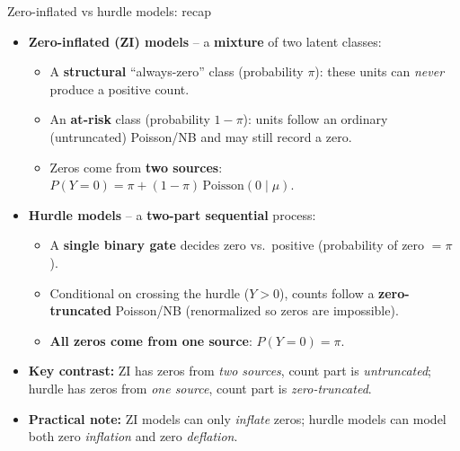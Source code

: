 \documentclass[10pt,ignorenonframetext,aspectratio=169]{beamer}
\begin{document}
\begin{frame}{Zero-inflated vs hurdle models: recap}
\begin{itemize}
    \item \textbf{Zero-inflated (ZI) models} -- a \textbf{mixture} of two latent classes:
    \begin{itemize}
        \item A \textbf{structural} ``always-zero'' class (probability $\pi$): these units can \emph{never} produce a positive count.
        \item An \textbf{at-risk} class (probability $1-\pi$): units follow an ordinary (untruncated) Poisson/NB and may still record a zero.
        \item Zeros come from \textbf{two sources}: $P(Y=0) = \pi + (1-\pi)\,\mathrm{Poisson}(0\mid\mu)$.
    \end{itemize}
    \item \textbf{Hurdle models} -- a \textbf{two-part sequential} process:
    \begin{itemize}
        \item A \textbf{single binary gate} decides zero vs.\ positive (probability of zero $= \pi$).
        \item Conditional on crossing the hurdle ($Y>0$), counts follow a \textbf{zero-truncated} Poisson/NB (renormalized so zeros are impossible).
        \item \textbf{All zeros come from one source}: $P(Y=0) = \pi$.
    \end{itemize}
    \item \textbf{Key contrast:} ZI has zeros from \emph{two sources}, count part is \emph{untruncated}; hurdle has zeros from \emph{one source}, count part is \emph{zero-truncated}.
    \item \textbf{Practical note:} ZI models can only \emph{inflate} zeros; hurdle models can model both zero \emph{inflation} and zero \emph{deflation}.
\end{itemize}
\end{frame}
\end{document}
